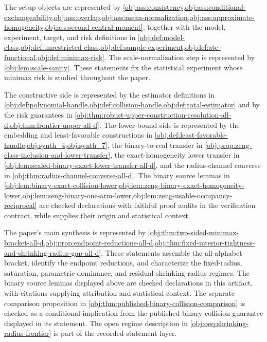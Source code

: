 \documentclass[11pt]{article}
\begin{document}
The setup objects are represented by \cref{obj:ass:consistency,obj:ass:conditional-exchangeability,obj:ass:overlap,obj:ass:mean-normalization,obj:ass:approximate-homogeneity,obj:ass:second-central-moment}, together with the model, experiment, target, and risk definitions in \cref{obj:def:model-class,obj:def:unrestricted-class,obj:def:sample-experiment,obj:def:ate-functional,obj:def:minimax-risk}. The scale-normalization step is represented by \cref{obj:lem:scale-sanity}. These statements fix the statistical experiment whose minimax risk is studied throughout the paper.

The constructive side is represented by the estimator definitions in \cref{obj:def:polynomial-handle,obj:def:collision-handle,obj:def:total-estimator} and by the risk guarantees in \cref{obj:thm:robust-upper-construction-resolution-all-d,obj:thm:frontier-upper-all-d}. The lower-bound side is represented by the embedding and least-favorable constructions in \cref{obj:def:least-favorable-handle,obj:synth_4,obj:synth_7}, the binary-to-real transfer in \cref{obj:prop:zeng-class-inclusion-and-lower-transfer}, the exact-homogeneity lower transfer in \cref{obj:lem:scaled-binary-exact-lower-transfer-all-d}, and the radius-channel converse in \cref{obj:thm:radius-channel-converse-all-d}. The binary source lemmas in \cref{obj:lem:binary-exact-collision-lower,obj:lem:zeng-binary-exact-homogeneity-lower,obj:lem:zeng-binary-one-arm-lower,obj:lem:zeng-usable-occupancy-reciprocal} are checked declarations with faithful proof audits in the verification contract, while \citet{ZengBalakrishnanHanKennedy2024} supplies their origin and statistical context.

The paper's main synthesis is represented by \cref{obj:thm:two-sided-minimax-bracket-all-d,obj:prop:endpoint-reductions-all-d,obj:thm:fixed-interior-tightness-and-shrinking-radius-gap-all-d}. These statements assemble the all-alphabet bracket, identify the endpoint reductions, and characterize the fixed-radius, saturation, parametric-dominance, and residual shrinking-radius regimes. The binary source lemmas displayed above are checked declarations in this artifact, with citations supplying attribution and statistical context. The separate comparison proposition in \cref{obj:thm:published-binary-collision-comparison} is checked as a conditional implication from the published binary collision guarantee displayed in its statement. The open regime description in \cref{obj:oeq:shrinking-radius-frontier} is part of the recorded statement layer.
\end{document}
